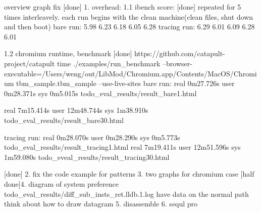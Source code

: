 overview graph fix [done]
1. overhead:
1.1 ibench score: [done]
   repeated for 5 times interleavely.
   each run begins with the clean machine(clean files, shut down and then boot)
   bare run: 5.98 6.23 6.18 6.05 6.28
   tracing run: 6.29 6.01 6.09 6.28 6.01

1.2 chromium runtime, benchmark [done]
https://github.com/catapult-project/catapult
time ./examples/run_benchmark --browser-executable=/Users/weng/out/LibMod/Chromium.app/Contents/MacOS/Chromium tbm_sample.tbm_sample --use-live-sites
bare run:
real	0m27.726s
user	0m28.371s
sys	0m5.015s
todo_eval_results/result_bare1.html

real	7m15.414s
user	12m48.744s
sys	1m38.910s
todo_eval_results/result_bare30.html

tracing run:
real	0m28.070s
user	0m28.290s
sys	0m5.773s
todo_eval_results/result_tracing1.html
real	7m19.411s
user	12m51.596s
sys	1m59.080s
todo_eveal_results/result_tracing30.html

[done] 2. fix the code example for patterns
3. two graphs for chromium case 
[half done]4. diagram of system preference
	todo_eval_results/diff_sub_insts_ret.lldb.1.log
	have data on the normal path
	think about how to draw datagram
5. disassemble
6. sequl pro
   

